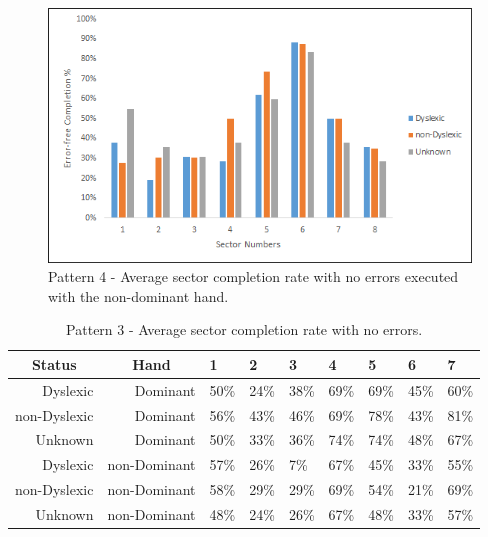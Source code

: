 		\begin{figure}[]
			\centering
			\includegraphics[width = \textwidth]{../images/pat_4_com_ndom}
			\caption{Pattern 4 - Average sector completion rate with no errors executed with the non-dominant hand.}
			\label{fig_pat_4_com_ndom}
		\end{figure}
	
	
		\begin{table}[]
			\centering
			\caption{Pattern 3 - Average sector completion rate with no errors.}
			\label{tab_pat_3_com}
			\begin{tabularx}{\textwidth}{|r|r|X|X|X|X|X|X|X|}
				\hline
				\multicolumn{1}{|c|}{\textbf{Status}} & \multicolumn{1}{c|}{\textbf{Hand}} & \textbf{1} & \textbf{2} & \textbf{3} & \textbf{4} & \textbf{5} & \textbf{6} & \textbf{7} \\ \hline
				Dyslexic                              & Dominant                           & 50\%       & 24\%       & 38\%       & 69\%       & 69\%       & 45\%       & 60\%       \\ \hline
				non-Dyslexic                          & Dominant                           & 56\%       & 43\%       & 46\%       & 69\%       & 78\%       & 43\%       & 81\%       \\ \hline
				Unknown                     & Dominant                           & 50\%       & 33\%       & 36\%       & 74\%       & 74\%       & 48\%       & 67\%       \\ \hline
				Dyslexic                              & non-Dominant                       & 57\%       & 26\%       & 7\%        & 67\%       & 45\%       & 33\%       & 55\%       \\ \hline
				non-Dyslexic                          & non-Dominant                       & 58\%       & 29\%       & 29\%       & 69\%       & 54\%       & 21\%       & 69\%       \\ \hline
				Unknown                    & non-Dominant                       & 48\%       & 24\%       & 26\%       & 67\%       & 48\%       & 33\%       & 57\%       \\ \hline
			\end{tabularx}
		\end{table}

